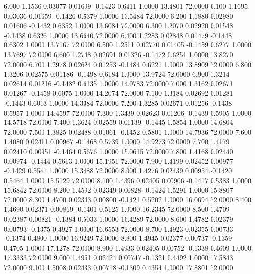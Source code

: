    6.000   1.1536   0.03077   0.01699  -0.1423   0.6411   1.0000  13.4801  72.0000
   6.100   1.1695   0.03036   0.01659  -0.1426   0.6379   1.0000  13.5484  72.0000
   6.200   1.1880   0.02980   0.01606  -0.1432   0.6352   1.0000  13.6084  72.0000
   6.300   1.2070   0.02920   0.01548  -0.1438   0.6326   1.0000  13.6640  72.0000
   6.400   1.2283   0.02848   0.01479  -0.1448   0.6302   1.0000  13.7167  72.0000
   6.500   1.2511   0.02770   0.01405  -0.1459   0.6277   1.0000  13.7697  72.0000
   6.600   1.2748   0.02691   0.01326  -0.1472   0.6251   1.0000  13.8270  72.0000
   6.700   1.2978   0.02624   0.01253  -0.1484   0.6221   1.0000  13.8909  72.0000
   6.800   1.3206   0.02575   0.01186  -0.1498   0.6184   1.0000  13.9724  72.0000
   6.900   1.3214   0.02614   0.01216  -0.1482   0.6135   1.0000  14.0783  72.0000
   7.000   1.3162   0.02671   0.01267  -0.1458   0.6075   1.0000  14.2074  72.0000
   7.100   1.3184   0.02692   0.01281  -0.1443   0.6013   1.0000  14.3384  72.0000
   7.200   1.3285   0.02671   0.01256  -0.1438   0.5957   1.0000  14.4597  72.0000
   7.300   1.3439   0.02623   0.01206  -0.1439   0.5905   1.0000  14.5718  72.0000
   7.400   1.3624   0.02559   0.01139  -0.1445   0.5854   1.0000  14.6804  72.0000
   7.500   1.3825   0.02488   0.01061  -0.1452   0.5801   1.0000  14.7936  72.0000
   7.600   1.4080   0.02411   0.00967  -0.1468   0.5739   1.0000  14.9273  72.0000
   7.700   1.4179   0.02410   0.00951  -0.1464   0.5676   1.0000  15.0615  72.0000
   7.800   1.4168   0.02440   0.00974  -0.1444   0.5613   1.0000  15.1951  72.0000
   7.900   1.4199   0.02452   0.00977  -0.1429   0.5541   1.0000  15.3488  72.0000
   8.000   1.4276   0.02439   0.00954  -0.1420   0.5464   1.0000  15.5129  72.0000
   8.100   1.4396   0.02405   0.00906  -0.1417   0.5383   1.0000  15.6842  72.0000
   8.200   1.4592   0.02349   0.00828  -0.1424   0.5291   1.0000  15.8807  72.0000
   8.300   1.4700   0.02343   0.00800  -0.1421   0.5202   1.0000  16.0694  72.0000
   8.400   1.4690   0.02371   0.00819  -0.1401   0.5125   1.0000  16.2345  72.0000
   8.500   1.4709   0.02387   0.00821  -0.1384   0.5033   1.0000  16.4289  72.0000
   8.600   1.4782   0.02379   0.00793  -0.1375   0.4927   1.0000  16.6553  72.0000
   8.700   1.4923   0.02355   0.00733  -0.1374   0.4800   1.0000  16.9249  72.0000
   8.800   1.4945   0.02377   0.00737  -0.1359   0.4705   1.0000  17.1278  72.0000
   8.900   1.4933   0.02405   0.00752  -0.1338   0.4609   1.0000  17.3333  72.0000
   9.000   1.4951   0.02424   0.00747  -0.1321   0.4492   1.0000  17.5843  72.0000
   9.100   1.5008   0.02433   0.00718  -0.1309   0.4354   1.0000  17.8801  72.0000
